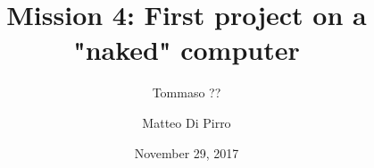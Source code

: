 \documentclass[a4paper,10pt]{article}
\begin{document}
\title{Mission 4: First project on a "naked" computer}
\author{Tommaso ?? \and Matteo Di Pirro}
\date{November 29, 2017}

\maketitle





\end{document}
